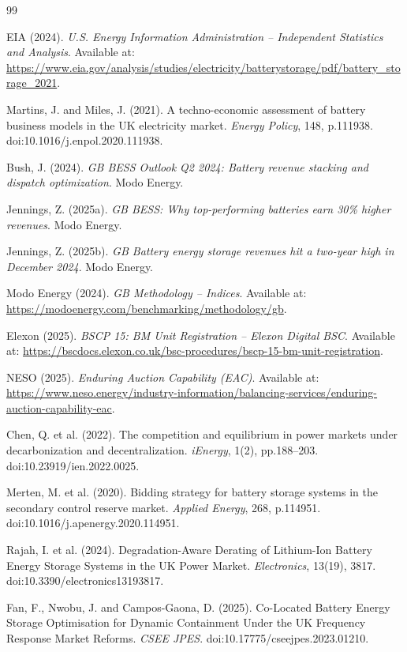 \documentclass[12pt,a4paper]{article}
\begin{document}
\begin{thebibliography}{99}

EIA (2024). \textit{U.S. Energy Information Administration -- Independent Statistics and Analysis}. Available at: \url{https://www.eia.gov/analysis/studies/electricity/batterystorage/pdf/battery_storage_2021}.

Martins, J. and Miles, J. (2021). A techno-economic assessment of battery business models in the UK electricity market. \textit{Energy Policy}, 148, p.111938. doi:10.1016/j.enpol.2020.111938.

Bush, J. (2024). \textit{GB BESS Outlook Q2 2024: Battery revenue stacking and dispatch optimization}. Modo Energy.

Jennings, Z. (2025a). \textit{GB BESS: Why top-performing batteries earn 30\% higher revenues}. Modo Energy.

Jennings, Z. (2025b). \textit{GB Battery energy storage revenues hit a two-year high in December 2024}. Modo Energy.

Modo Energy (2024). \textit{GB Methodology -- Indices}. Available at: \url{https://modoenergy.com/benchmarking/methodology/gb}.


Elexon (2025). \textit{BSCP 15: BM Unit Registration -- Elexon Digital BSC}. Available at: \url{https://bscdocs.elexon.co.uk/bsc-procedures/bscp-15-bm-unit-registration}.

NESO (2025). \textit{Enduring Auction Capability (EAC)}. Available at: \url{https://www.neso.energy/industry-information/balancing-services/enduring-auction-capability-eac}.

Chen, Q. et al. (2022). The competition and equilibrium in power markets under decarbonization and decentralization. \textit{iEnergy}, 1(2), pp.188--203. doi:10.23919/ien.2022.0025.

Merten, M. et al. (2020). Bidding strategy for battery storage systems in the secondary control reserve market. \textit{Applied Energy}, 268, p.114951. doi:10.1016/j.apenergy.2020.114951.

Rajah, I. et al. (2024). Degradation-Aware Derating of Lithium-Ion Battery Energy Storage Systems in the UK Power Market. \textit{Electronics}, 13(19), 3817. doi:10.3390/electronics13193817.

Fan, F., Nwobu, J. and Campos-Gaona, D. (2025). Co-Located Battery Energy Storage Optimisation for Dynamic Containment Under the UK Frequency Response Market Reforms. \textit{CSEE JPES}. doi:10.17775/cseejpes.2023.01210.


\end{thebibliography}
\end{document}
